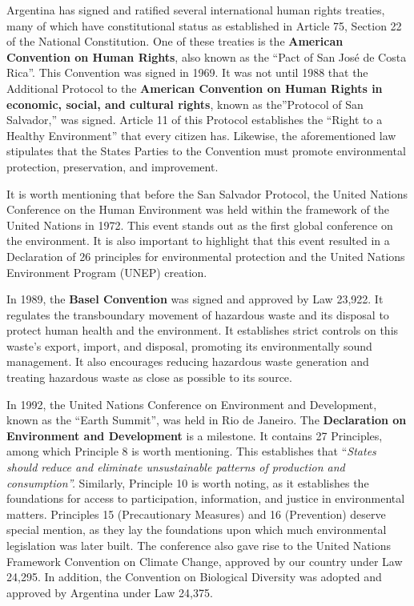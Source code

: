 \documentclass[
  12pt,
  oneside]{book}
\begin{document}
Argentina has signed and ratified several international human rights
treaties, many of which have constitutional status as established in
Article 75, Section 22 of the National Constitution. One of these
treaties is the \textbf{American Convention on Human Rights}, also known
as the ``Pact of San José de Costa Rica''. This Convention was signed in
1969. It was not until 1988 that the Additional Protocol to the
\textbf{American Convention on Human Rights in economic, social, and
cultural rights}, known as the''Protocol of San Salvador,'' was signed.
Article 11 of this Protocol establishes the ``Right to a Healthy
Environment'' that every citizen has. Likewise, the aforementioned law
stipulates that the States Parties to the Convention must promote
environmental protection, preservation, and improvement.

It is worth mentioning that before the San Salvador Protocol, the United
Nations Conference on the Human Environment was held within the
framework of the United Nations in 1972. This event stands out as the
first global conference on the environment. It is also important to
highlight that this event resulted in a Declaration of 26 principles for
environmental protection and the United Nations Environment Program
(UNEP) creation.

In 1989, the \textbf{Basel Convention} was signed and approved by Law
23,922. It regulates the transboundary movement of hazardous waste and
its disposal to protect human health and the environment. It establishes
strict controls on this waste's export, import, and disposal, promoting
its environmentally sound management. It also encourages reducing
hazardous waste generation and treating hazardous waste as close as
possible to its source.

In 1992, the United Nations Conference on Environment and Development,
known as the ``Earth Summit'', was held in Rio de Janeiro. The
\textbf{Declaration on Environment and Development} is a milestone. It
contains 27 Principles, among which Principle 8 is worth mentioning.
This establishes that ``\emph{States should reduce and eliminate
unsustainable patterns of production and consumption''. }Similarly,
Principle 10 is worth noting, as it establishes the foundations for
access to participation, information, and justice in environmental
matters. Principles 15 (Precautionary Measures) and 16 (Prevention)
deserve special mention, as they lay the foundations upon which much
environmental legislation was later built. The conference also gave rise
to the United Nations Framework Convention on Climate Change, approved
by our country under Law 24,295. In addition, the Convention on
Biological Diversity was adopted and approved by Argentina under Law
24,375.
\end{document}
